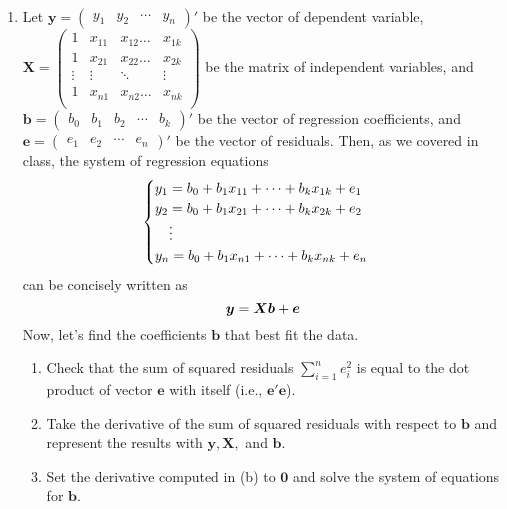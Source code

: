 \documentclass[pdflatex, letterpaper, 12pt]{scrartcl}
\begin{document}
\begin{enumerate}
\item Let $\bm{y} = \begin{pmatrix}
y_1 & y_2 & \cdots & y_n
\end{pmatrix}'
$ be the vector of dependent variable, $\bm{X} =
\begin{pmatrix}
 1 & x_{11} & x_{12} \ldots & x_{1k} \\
 1 & x_{21} & x_{22} \ldots & x_{2k} \\
 \vdots & \vdots & \ddots & \vdots \\
 1 & x_{n1} & x_{n2} \ldots & x_{nk} \\
\end{pmatrix}
$ be the matrix of independent variables, and $\bm{b} = \begin{pmatrix}
b_0 & b_1 & b_2 & \cdots & b_k
\end{pmatrix}'
$ be the vector of regression coefficients, and $\bm{e} = \begin{pmatrix}
e_1 & e_2 & \cdots & e_n
\end{pmatrix}'
$ be the vector of residuals. Then, as we covered in class, the system of regression equations 
\begin{eqnarray}
 \begin{cases}
 y_1 = b_0 + b_1 x_{11} + \cdots + b_k x_{1k} + e_1 & \\
 y_2 = b_0 + b_1 x_{21} + \cdots + b_k x_{2k} + e_2 & \\
 \ \ \ \vdots & \\
 y_n = b_0 + b_1 x_{n1} + \cdots + b_k x_{nk} + e_n & \notag
 \end{cases}
 \end{eqnarray}
can be concisely written as 
\begin{equation}
\bm{y} = \bm{Xb} + \bm{e} \notag
\end{equation}
Now, let's find the coefficients $\bm{b}$ that best fit the data.
 \begin{enumerate}[label=(\alph*)]
 \item Check that the sum of squared residuals $\sum_{i = 1}^{n} e^2_i$ is equal to the dot product of vector $\bm{e}$ with itself (i.e., $\bm{e}'\bm{e}$).
 \item Take the derivative of the sum of squared residuals with respect to $\bm{b}$ and represent the results with $\bm{y}, \bm{X}, $ and $\bm{b}$.
 \item Set the derivative computed in (b) to $\bm{0}$ and solve the system of equations for $\bm{b}$.
 \end{enumerate}

\end{enumerate}
\end{document}

